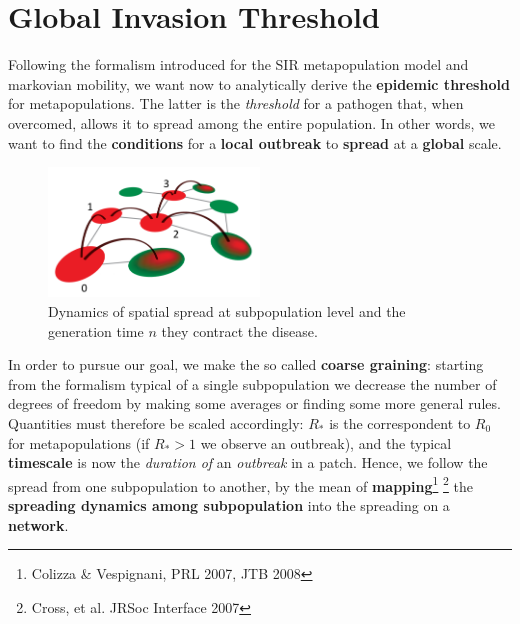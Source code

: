 \documentclass[../main/main.tex]{subfiles}
\begin{document}

\section{Global Invasion Threshold}

Following the formalism introduced for the SIR metapopulation model and markovian mobility, we want now to analytically derive the \textbf{epidemic threshold} for metapopulations. The latter is the \textit{threshold} for a pathogen that, when overcomed, allows it to spread among the entire population. In other words, we want to find the \textbf{conditions} for a \textbf{local outbreak} to \textbf{spread} at a \textbf{global} scale.

\begin{figure}[h!]
\centering
\includegraphics[width=0.5\textwidth]{../lessons/image/16/image01.png}
\caption{\label{fig:16_01} Dynamics of spatial spread at subpopulation level and the generation time $n$ they contract the disease.}
\end{figure}

In order to pursue our goal, we make the so called \textbf{coarse graining}: starting from the formalism typical of a single subpopulation we decrease the number of degrees of freedom by making some averages or finding some more general rules. Quantities must therefore be scaled accordingly: $R_*$ is the correspondent to $R_0$ for metapopulations (if $R_* > 1$ we observe an outbreak), and the typical \textbf{timescale} is now the \textit{duration of} an \textit{outbreak} in a patch. Hence, we follow the spread from one subpopulation to another, by the mean of \textbf{mapping}\footnote{Colizza \& Vespignani, PRL 2007, JTB 2008} \footnote{Cross, et al. JRSoc Interface 2007} the \textbf{spreading dynamics among subpopulation} into the spreading on a \textbf{network}.
\end{document}
